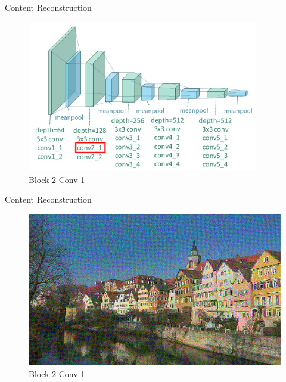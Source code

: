 \documentclass{beamer}
\begin{document}
\begin{frame}{Content Reconstruction}
\begin{figure}[ht]
\centering
\caption{Block 2 Conv 1}
\includegraphics[width=0.9\textwidth]{img/vgg19/content/block2_conv1}
\end{figure}
\end{frame}
\begin{frame}{Content Reconstruction}
\begin{figure}[ht]
\centering
\caption{Block 2 Conv 1}
\includegraphics[width=\textwidth]{img/content/block2_conv1.png}
\end{figure}
\end{frame}
\end{document}
